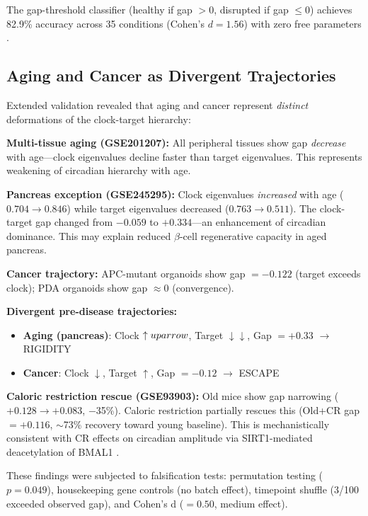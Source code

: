 \documentclass[11pt,letterpaper]{article}
\begin{document}
The gap-threshold classifier (healthy if gap $> 0$, disrupted if gap $\leq 0$) achieves 82.9\% accuracy across 35 conditions (Cohen's $d = 1.56$) with zero free parameters \citep{whiteside2026paper1}.

\subsection{Aging and Cancer as Divergent Trajectories}

Extended validation revealed that aging and cancer represent \textit{distinct} deformations of the clock-target hierarchy:

\textbf{Multi-tissue aging (GSE201207):} All peripheral tissues show gap \textit{decrease} with age---clock eigenvalues decline faster than target eigenvalues. This represents weakening of circadian hierarchy with age.

\textbf{Pancreas exception (GSE245295):} Clock eigenvalues \textit{increased} with age ($0.704 \rightarrow 0.846$) while target eigenvalues decreased ($0.763 \rightarrow 0.511$). The clock-target gap changed from $-0.059$ to $+0.334$---an enhancement of circadian dominance. This may explain reduced $\beta$-cell regenerative capacity in aged pancreas.

\textbf{Cancer trajectory:} APC-mutant organoids show gap $= -0.122$ (target exceeds clock); PDA organoids show gap $\approx 0$ (convergence).

\textbf{Divergent pre-disease trajectories:}
\begin{itemize}[noitemsep]
    \item \textbf{Aging (pancreas)}: Clock $\uparrow\\uparrow$, Target $\downarrow\downarrow$, Gap $= +0.33$ $\rightarrow$ RIGIDITY
    \item \textbf{Cancer}: Clock $\downarrow$, Target $\uparrow$, Gap $= -0.12$ $\rightarrow$ ESCAPE
\end{itemize}

\textbf{Caloric restriction rescue (GSE93903):} Old mice show gap narrowing ($+0.128 \rightarrow +0.083$, $-$35\%). Caloric restriction partially rescues this (Old+CR gap $= +0.116$, $\sim$73\% recovery toward young baseline). This is mechanistically consistent with CR effects on circadian amplitude via SIRT1-mediated deacetylation of BMAL1 \citep{sato2017}.

These findings were subjected to falsification tests: permutation testing ($p = 0.049$), housekeeping gene controls (no batch effect), timepoint shuffle (3/100 exceeded observed gap), and Cohen's d ($= 0.50$, medium effect).
\end{document}
